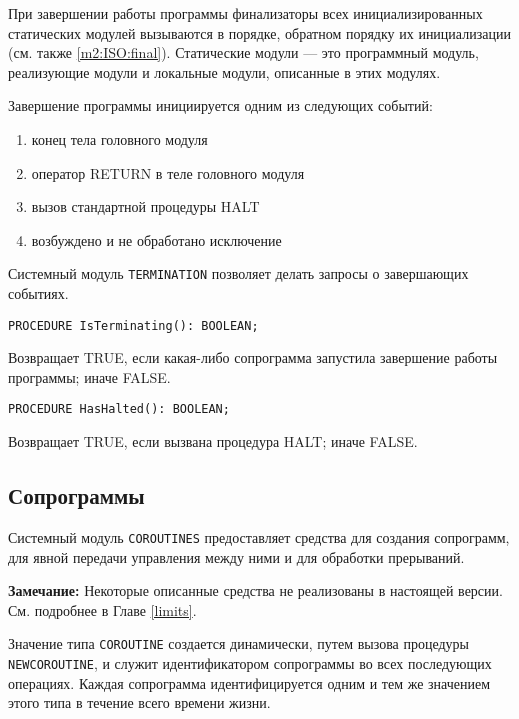 При завершении работы программы финализаторы всех инициализированных
статических модулей вызываются в порядке, обратном порядку их
инициализации (см. также \ref{m2:ISO:final}). 
Статические модули --- это программный модуль, реализующие модули
и локальные модули, описанные в этих модулях.

Завершение программы инициируется одним из следующих событий:
\begin{enumerate}
\item конец тела головного модуля
\item оператор RETURN в теле головного модуля
\item вызов стандартной процедуры HALT
\item возбуждено и не обработано исключение
\end{enumerate}

Системный модуль {\tt TERMINATION}
позволяет делать запросы о завершающих событиях.

\begin{verbatim}
PROCEDURE IsTerminating(): BOOLEAN;
\end{verbatim}

Возвращает TRUE, если какая-либо сопрограмма запустила
завершение работы программы; иначе FALSE.

\begin{verbatim}
PROCEDURE HasHalted(): BOOLEAN;
\end{verbatim}

Возвращает TRUE, если вызвана процедура HALT; иначе FALSE.

\subsection{Сопрограммы}\label{m2:ISO:coroutines}

Системный модуль {\tt COROUTINES} предоставляет средства для
создания сопрограмм, для явной передачи управления между ними и для
обработки прерываний.

{\bf Замечание:} Некоторые описанные средства не реализованы 
в настоящей версии.
См. подробнее в Главе \ref{limits}.

Значение типа {\tt COROUTINE} создается динамически, путем вызова
процедуры {\tt NEWCOROUTINE}, и служит идентификатором сопрограммы
во всех последующих операциях. Каждая сопрограмма идентифицируется 
одним и тем же значением этого типа в течение всего времени жизни.

